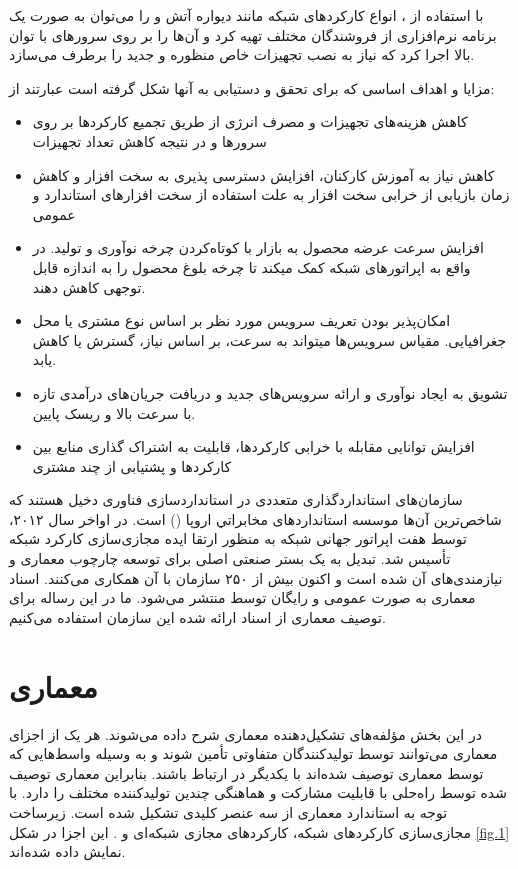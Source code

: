 با استفاده از ، انواع کارکردهای شبکه مانند دیواره آتش و 
را می‌توان به صورت یک برنامه نرم‌افزاری از فروشندگان مختلف تهیه کرد و
آن‌ها را بر روی سرورهای با توان بالا اجرا کرد که نیاز به نصب تجهیزات خاص منظوره و
جدید را برطرف می‌سازد.

مزایا و اهداف اساسی که  برای تحقق و دست‍یابی به آن‍ها شکل گرفته است عبارتند از:

\begin{itemize}
    \item
    کاهش هزینه‌های تجهیزات و مصرف انرژی از طریق تجمیع کارکردها بر روی سرورها و در نتیجه کاهش تعداد تجهیزات
    \item
    کاهش نیاز به آموزش کارکنان، افزایش دسترسی پذیری به سخت افزار و کاهش زمان بازیابی از خرابی سخت افزار به علت استفاده از سخت افزارهای استاندارد و عمومی
    \item
    افزایش سرعت عرضه محصول به بازار با کوتاه‌کردن چرخه نوآوری و تولید. در واقع  به اپراتورهای شبکه کمک می‍کند تا چرخه بلوغ محصول را به اندازه قابل توجهی کاهش دهند.
    \item
    امکان‌پذیر بودن تعریف سرویس مورد نظر بر اساس نوع مشتری یا محل جغرافیایی. مقیاس سرویس‌ها می‍تواند به سرعت، بر اساس نیاز، گسترش یا کاهش یابد.
    \item
    تشویق به ایجاد نوآوری و ارائه سرویس‌های جدید و دریافت جریان‌های درآمدی تازه با سرعت بالا و ریسک پایین.
    \item
    افزایش توانایی  مقابله با خرابی کارکردها، قابلیت به اشتراک گذاری منابع بین کارکردها و پشتیابی از چند مشتری
\end{itemize}

سازمان‌های استانداردگذاری متعددی در استانداردسازی فناوری  دخیل هستند که شاخص‌ترین آن‌ها موسسه استانداردهای مخابراتي اروپا () است.
در اواخر سال ۲۰۱۲،
توسط هفت اپراتور جهانی شبکه به منظور ارتقا ایده مجازی‌سازی کارکرد شبکه تأسیس شد.
تبدیل به یک بستر صنعتی اصلی برای توسعه چارچوب معماری  و نیازمندی‌های آن شده است و اکنون بیش از ۲۵۰ سازمان با آن همکاری می‌کنند.
اسناد معماری  به صورت عمومی و رایگان توسط  منتشر می‌شود.
ما در این رساله برای توصیف معماری  از اسناد ارائه شده این سازمان استفاده می‌کنیم.

\section{معماری }

در این بخش مؤلفه‌های تشکیل‌دهنده معماری  شرح داده می‌شوند.
هر یک از اجزای معماری می‌توانند توسط تولیدکنندگان متفاوتی تأمین شوند و به وسیله واسط‌هایی که توسط معماری 
توصیف شده‌اند با یکدیگر در ارتباط باشند.
بنابراین معماری  توصیف شده توسط  راه‌حلی با قابلیت مشارکت و هماهنگی چندین تولیدکننده مختلف را دارد.
با توجه به استاندارد  معماری 
از سه عنصر کلیدی تشکیل شده است.
زیرساخت مجازی‌سازی کارکردهای شبکه،
کارکردهای مجازی شبکه‌ای و
.
این اجزا در شکل \ref{fig.1} نمایش داده شده‌اند.

